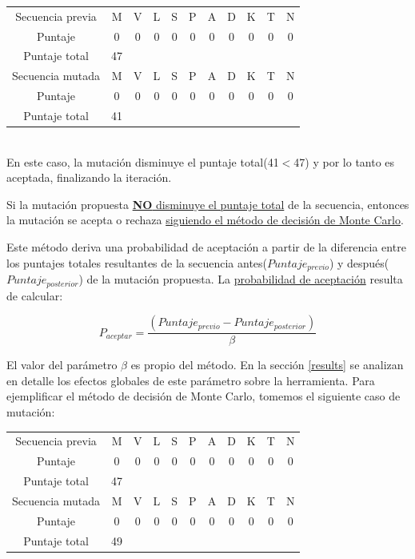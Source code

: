 \begin{enumerate}
       \begin{tabular}{ccccccccccc}
	Secuencia previa &  M & V & L & S & P & A & D & K & T & N\\ 
	Puntaje & 0 & 0 & 0 & 0 & 0 & 0 & 0 & 0 & 0 & 0\\
       Puntaje total & 47 \\ \hline \hline
       Secuencia mutada &  M & V & L & S & P & A & D & K & T & N\\ 
	Puntaje & 0 & 0 & 0 & 0 & 0 & 0 & 0 & 0 & 0 & 0\\
       Puntaje total & 41 \\
      \end{tabular}\\
      
    En este caso, la mutación disminuye el puntaje total(41$<$47) y por lo tanto es aceptada, finalizando la iteración.
    
    
    Si la mutación propuesta \underline{\textbf{NO} disminuye el puntaje total} de la secuencia, entonces la mutación se acepta o rechaza \underline{siguiendo el método de decisión de Monte Carlo}. 
    
    Este método deriva una probabilidad de aceptación a partir de la diferencia entre los puntajes totales resultantes de la secuencia antes($Puntaje_{previo}$) y después($Puntaje_{posterior}$) de la mutación propuesta.
    La \underline{probabilidad de aceptación} resulta de calcular:
    
    \begin{equation}\label{monteCarlo}
    P_{aceptar} =  \frac{(Puntaje_{previo}  - Puntaje_{posterior}) } {\beta} 
    \end{equation}

    
    El valor del parámetro $\beta$ es propio del método. 
    En la sección \ref{results} se analizan en detalle los efectos globales de este parámetro sobre la herramienta.
    Para ejemplificar el método de decisión de Monte Carlo, tomemos el siguiente caso de mutación:
    

       \begin{tabular}{ccccccccccc}
	Secuencia previa &  M & V & L & S & P & A & D & K & T & N\\ 
	Puntaje & 0 & 0 & 0 & 0 & 0 & 0 & 0 & 0 & 0 & 0\\
       Puntaje total & 47 \\ \hline \hline
       Secuencia mutada &  M & V & L & S & P & A & D & K & T & N\\ 
	Puntaje & 0 & 0 & 0 & 0 & 0 & 0 & 0 & 0 & 0 & 0\\
       Puntaje total & 49 \\
      \end{tabular}\\
    

\end{enumerate}
